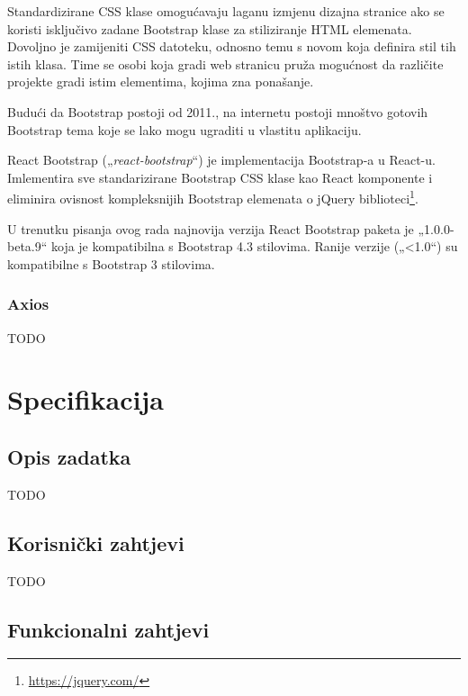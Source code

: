 \documentclass[times, utf8, diplomski, numeric]{fer}
\newcommand{\razmakp}{\vspace{18pt}}
\begin{document}
Standardizirane CSS klase omogućavaju laganu izmjenu dizajna stranice ako se koristi isključivo zadane Bootstrap klase za stiliziranje HTML elemenata.
Dovoljno je zamijeniti CSS datoteku, odnosno temu s novom koja definira stil tih istih klasa.
Time se osobi koja gradi web stranicu pruža mogućnost da različite projekte gradi istim elementima, kojima zna ponašanje.

Budući da Bootstrap postoji od 2011.\citep{wiki_bs}, na internetu postoji mnoštvo gotovih Bootstrap tema koje se lako mogu ugraditi u vlastitu aplikaciju.

\razmakp

React Bootstrap („\emph{react-bootstrap}“) je implementacija Bootstrap-a u React-u.
Imlementira sve standarizirane Bootstrap CSS klase kao React komponente i eliminira ovisnost kompleksnijih Bootstrap elemenata o jQuery biblioteci\footnote{\url{https://jquery.com/}}.

U trenutku pisanja ovog rada najnovija verzija React Bootstrap paketa je „1.0.0-beta.9“ koja je kompatibilna s Bootstrap 4.3 stilovima.
Ranije verzije („<1.0“) su kompatibilne s Bootstrap 3 stilovima\citep{bs_react}.


\subsection{Axios}

TODO



\chapter{Specifikacija}


\section{Opis zadatka}

TODO


\section{Korisnički zahtjevi}

TODO


\section{Funkcionalni zahtjevi}
\end{document}

